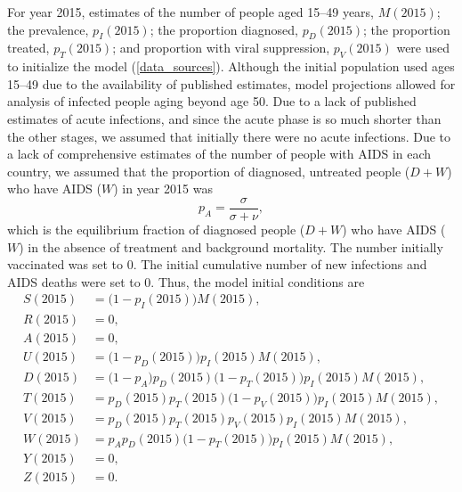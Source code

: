 \documentclass{article}
\begin{document}
For year 2015, estimates of the number of people aged 15--49 years,
$M(2015)$; the prevalence, $p_I(2015)$; the proportion diagnosed,
$p_D(2015)$; the proportion treated, $p_T(2015)$; and proportion with
viral suppression, $p_V(2015)$ were used to initialize the model
(\autoref{data_sources}).  Although the initial population used ages
15--49 due to the availability of published estimates, model
projections allowed for analysis of infected people aging beyond age
50.  Due to a lack of published estimates of acute infections, and
since the acute phase is so much shorter than the other stages, we
assumed that initially there were no acute infections.  Due to a lack
of comprehensive estimates of the number of people with AIDS in each
country, we assumed that the proportion of diagnosed, untreated people
($D + W$) who have AIDS ($W$) in year 2015 was
\begin{equation}
  p_A = \frac{\sigma}{\sigma + \nu},
\end{equation}
which is the equilibrium fraction of diagnosed people ($D + W$) who
have AIDS ($W$) in the absence of treatment and background mortality.
The number initially vaccinated was set to 0.  The initial cumulative
number of new infections and AIDS deaths were set to 0.  Thus, the
model initial conditions are
\begin{equation}
  \label{initial_conditions}
  \begin{split}
    S(2015) &= \big(1 - p_I(2015)\big) M(2015), \\
    R(2015) &= 0, \\
    A(2015) &= 0, \\
    U(2015) &= \big(1 - p_D(2015)\big) p_I(2015) M(2015), \\
    D(2015) &= \big(1 - p_A\big) p_D(2015) \big(1 - p_T(2015)\big)
    p_I(2015) M(2015), \\
    T(2015) &= p_D(2015) p_T(2015) \big(1 - p_V(2015)\big)
    p_I(2015) M(2015), \\
    V(2015) &= p_D(2015) p_T(2015) p_V(2015) p_I(2015) M(2015), \\
    W(2015) &= p_A p_D(2015) \big(1 - p_T(2015)\big) p_I(2015) M(2015), \\
    Y(2015) &= 0, \\
    Z(2015) &= 0.
  \end{split}
\end{equation}
\end{document}

